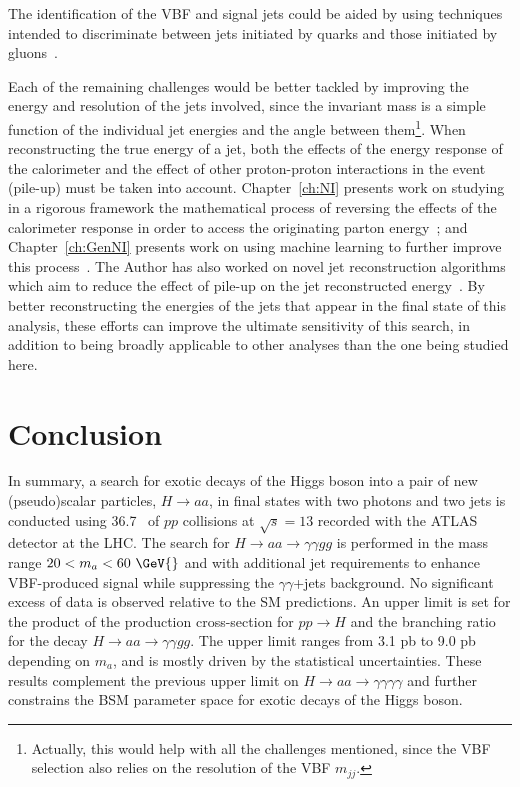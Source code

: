 The identification of the VBF and signal jets could be aided by using techniques intended to discriminate between jets initiated by quarks and those initiated by gluons~\cite{ATL-PHYS-PUB-2017-009,Aad:2014gea,ATLAS-CONF-2016-034,ATL-PHYS-PUB-2017-017}.

Each of the remaining challenges would be better tackled by improving the energy and \pt{} resolution of the jets involved, since the invariant mass is a simple function of the individual jet energies and the angle between them\footnote{Actually, this would help with all the challenges mentioned, since the VBF selection also relies on the resolution of the VBF $m_{jj}$.}.
When reconstructing the true energy of a jet, both the effects of the energy response of the calorimeter and the effect of other proton-proton interactions in the event (pile-up) must be taken into account.
Chapter~\ref{ch:NI} presents work on studying in a rigorous framework the mathematical process of reversing the effects of the calorimeter response in order to access the originating parton energy~\cite{Cukierman:2016dkb};
and Chapter~\ref{ch:GenNI} presents work on using machine learning to further improve this process~\cite{ATL-PHYS-PUB-2018-013}.
The Author has also worked on novel jet reconstruction algorithms which aim to reduce the effect of pile-up on the jet reconstructed energy~\cite{ATLAS-CONF-2017-065}.
By better reconstructing the energies of the jets that appear in the final state of this analysis, these efforts can improve the ultimate sensitivity of this search, in addition to being broadly applicable to other analyses than the one being studied here. 

\clearpage
\section{Conclusion}
\label{sec:HBSM:conclusion}
In summary, a search for exotic decays of the Higgs boson into a pair of new (pseudo)scalar particles,
$H\to aa$, in final states with two photons 
and two jets is conducted using 36.7~\ifb{} of $pp$ collisions at $\sqrt{s}=13$ \TeV{} recorded 
with the ATLAS detector at the LHC. The search for $H\to aa \to \gamma\gamma gg$ is performed
in the mass range $20 < m_a < 60~\GeV{}$ and with additional jet requirements 
to enhance VBF-produced signal while suppressing the $\gamma\gamma$+jets background.
No significant excess of data is observed relative to the SM predictions. An upper limit
is set for the product of the production cross-section for $pp\to H$ and the branching
ratio for the decay $H\to aa\to\gamma\gamma gg$. The upper limit ranges from 3.1 pb to 9.0 pb depending
on $m_a$, and is mostly driven by the statistical uncertainties.
These results complement the previous upper limit on $H\to aa\to\gamma\gamma\gamma\gamma$ and
further constrains the BSM parameter space for exotic decays of the Higgs boson.

